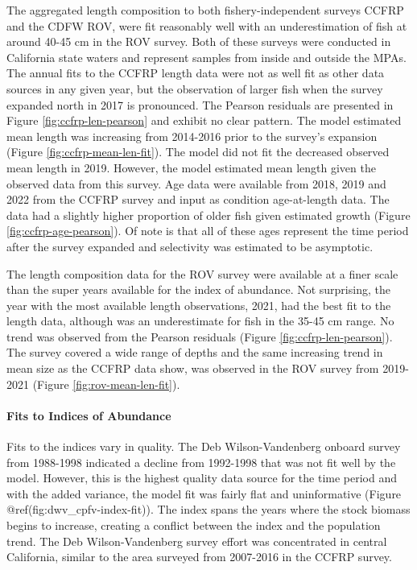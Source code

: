 \documentclass[11pt,
  english,
  letterpaper,
]{article}
\begin{document}
The aggregated length composition to both fishery-independent surveys CCFRP and the CDFW ROV, were fit reasonably well with an underestimation of fish at around 40-45 cm in the ROV survey. Both of these surveys were conducted in California state waters and represent samples from inside and outside the MPAs. The annual fits to the CCFRP length data were not as well fit as other data sources in any given year, but the observation of larger fish when the survey expanded north in 2017 is pronounced. The Pearson residuals are presented in Figure \ref{fig:ccfrp-len-pearson} and exhibit no clear pattern. The model estimated mean length was increasing from 2014-2016 prior to the survey's expansion (Figure \ref{fig:ccfrp-mean-len-fit}). The model did not fit the decreased observed mean length in 2019. However, the model estimated mean length given the observed data from this survey. Age data were available from 2018, 2019 and 2022 from the CCFRP survey and input as condition age-at-length data. The data had a slightly higher proportion of older fish given estimated growth (Figure \ref{fig:ccfrp-age-pearson}). Of note is that all of these ages represent the time period after the survey expanded and selectivity was estimated to be asymptotic.

The length composition data for the ROV survey were available at a finer scale than the super years available for the index of abundance. Not surprising, the year with the most available length observations, 2021, had the best fit to the length data, although was an underestimate for fish in the 35-45 cm range. No trend was observed from the Pearson residuals (Figure \ref{fig:ccfrp-len-pearson}). The survey covered a wide range of depths and the same increasing trend in mean size as the CCFRP data show, was observed in the ROV survey from 2019-2021 (Figure \ref{fig:rov-mean-len-fit}).

\hypertarget{fits-to-indices-of-abundance}{%
\paragraph{Fits to Indices of Abundance}\label{fits-to-indices-of-abundance}}

Fits to the indices vary in quality. The Deb Wilson-Vandenberg onboard survey from 1988-1998 indicated a decline from 1992-1998 that was not fit well by the model. However, this is the highest quality data source for the time period and with the added variance, the model fit was fairly flat and uninformative (Figure @ref(fig:dwv\_cpfv-index-fit)). The index spans the years where the stock biomass begins to increase, creating a conflict between the index and the population trend. The Deb Wilson-Vandenberg survey effort was concentrated in central California, similar to the area surveyed from 2007-2016 in the CCFRP survey.
\end{document}

